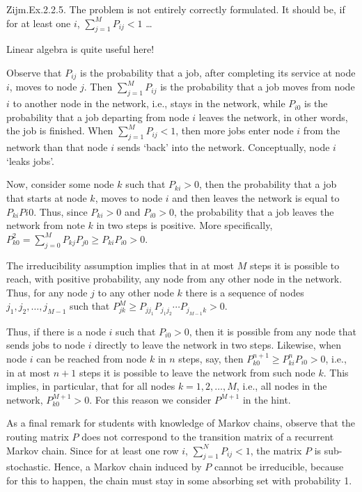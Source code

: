 \begin{exercise}
  Zijm.Ex.2.2.5. The problem is not entirely correctly formulated. It
  should be, if for at least one $i$, $\sum_{j=1}^M P_{i j} <1$ \ldots
\begin{solution}
Linear algebra is quite useful here!

Observe that $P_{i j}$ is the probability that a job, after completing
its service at node $i$, moves to node $j$. Then $\sum_{j=1}^M P_{i j}$
is the probability that a job moves from node $i$ to another node in
the network, i.e., stays in the network, while $P_{i0}$ is the
probability that a job departing from node $i$ leaves the network, in
other words, the job is finished. When $\sum_{j=1}^M P_{i j} < 1$, then
more jobs enter node $i$ from the network than that node $i$ sends
`back' into the network. Conceptually, node $i$ `leaks jobs'.

  Now, consider some node $k$ such that $P_{ki} > 0$, then the
  probability that a job that starts at node $k$, moves to node $i$
  and then leaves the network is equal to $P_{ki}P{i0}$. Thus, since
  $P_{ki}>0$ and $P_{i0}>0$, the probability that a job leaves the
  network from note $k$ in two steps is positive.  More specifically,
  $P^2_{k0} = \sum_{j=0}^M P_{kj}P_{j0} \geq P_{ki}P_{i0} > 0$. 

  The irreducibility assumption implies that in at most $M$ steps it
  is possible to reach, with positive probability, any node from any
  other node in the network. Thus, for any node $j$ to any other node
  $k$ there is a sequence of nodes $j_1, j_2, \ldots, j_{M-1}$ such
  that  $P^{M}_{jk} \geq P_{j j_1}P_{j_1 j_2}\cdots P_{j_{M-1}k} > 0$.


  Thus, if there is a node $i$ such that $P_{i0}>0$, then it is
  possible from any node that sends jobs to node $i$ directly to leave
  the network in two steps. Likewise, when node $i$ can be reached
  from node $k$ in $n$ steps, say, then
  $P^{n+1}_{k0} \geq P^n_{ki}P_{i0} > 0$, i.e., in at most $n+1$ steps
  it is possible to leave the network from such node $k$. This
  implies, in particular, that for all nodes $k=1,2,\ldots, M$, i.e.,
  all nodes in the network, $P^{M+1}_{k0} >0$.  For this reason we
  consider $P^{M+1}$ in the hint.


  As a final remark for students with knowledge of Markov chains,
  observe that the routing matrix $P$ does not correspond to the
  transition matrix of a recurrent Markov chain. Since for at least
  one row $i$, $\sum_{j=1}^N P_{i j}<1$, the matrix $P$ is
  sub-stochastic. Hence, a Markov chain induced by $P$ cannot be
  irreducible, because for this to happen, the chain must stay in some
  absorbing set with probability 1.
\end{solution}
\end{exercise}

